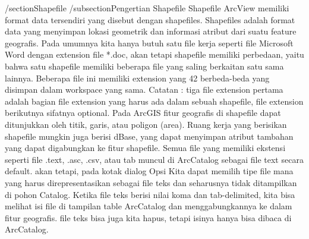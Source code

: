 

/section{Shapefile}
/subsection{Pengertian Shapefile}
Shapefile ArcView memiliki format data tersendiri yang disebut dengan shapefiles. 
Shapefiles adalah format data yang menyimpan lokasi geometrik dan informasi atribut dari suatu feature geografis. 
Pada umumnya kita hanya butuh satu file kerja seperti file Microsoft Word dengan extension file *.doc, 
akan tetapi shapefile memiliki perbedaan, yaitu bahwa satu shapefile memiliki beberapa file yang saling berkaitan satu sama lainnya. 
Beberapa file ini memiliki extension yang 42 berbeda-beda yang disimpan dalam workspace yang sama.
Catatan : tiga file extension pertama adalah bagian file extension yang harus ada dalam sebuah shapefile, file extension berikutnya sifatnya optional.
Pada ArcGIS fitur geografis di shapefile dapat ditunjukkan oleh titik, garis, atau poligon (area). Ruang kerja yang berisikan shapefile mungkin juga berisi dBase, yang dapat menyimpan atribut tambahan yang dapat digabungkan ke fitur shapefile. Semua file yang memiliki ekstensi seperti file .text, .asc, .csv, atau tab muncul di ArcCatalog sebagai file text secara default. akan tetapi, pada kotak dialog Opsi Kita dapat memilih tipe file mana yang harus direpresentasikan sebagai file teks dan seharusnya tidak ditampilkan di pohon Catalog. Ketika file teks berisi nilai koma dan tab-delimited, kita bisa melihat isi file di tampilan table ArcCatalog dan menggabungkannya ke dalam fitur geografis. file teks bisa juga kita hapus, tetapi isinya hanya bisa dibaca di ArcCatalog.
